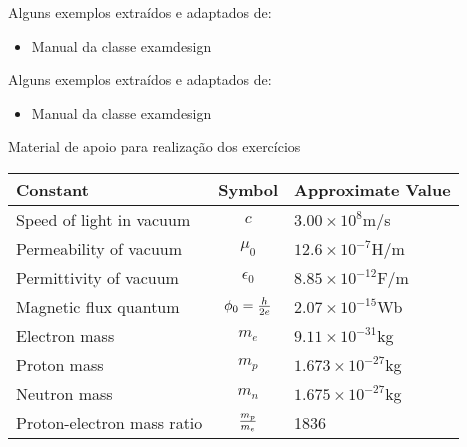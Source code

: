 \documentclass[11pt]{examdesign}
\begin{document}
\begin{examclosing}
\vfill
\begin{notap}
Alguns exemplos extraídos e adaptados de:
\begin{itemize}
	\item Manual da classe examdesign
\end{itemize}
\end{notap}
\end{examclosing}
\begin{keyclosing}
\vfill
\begin{notap}
Alguns exemplos extraídos e adaptados de:
\begin{itemize}
	\item Manual da classe examdesign
\end{itemize}
\end{notap}
\end{keyclosing}


\begin{endmatter}

\centerline
{\Large Material de apoio para realização dos exercícios}
\bigskip
\bigskip

  \begin{center}
  \begin{tabular}{lcl}
    Constant & Symbol & Approximate Value \\ \hline
    Speed of light in vacuum & $c$ & $3.00 \times 10^8$m/s \\
    Permeability of vacuum & $\mu_0$ & $12.6 \times 10^{-7}$H/m \\
    Permittivity of vacuum & $\epsilon_0$ & $8.85 \times 10^{-12}$F/m \\
    Magnetic flux quantum & $\phi_0 = {h \over 2e}$ & $2.07 \times 10^{-15}$Wb \\
    Electron mass & $m_e$ & $9.11 \times 10^{-31}$kg \\
    Proton mass & $m_p$ & $1.673 \times 10^{-27}$kg \\
    Neutron mass & $m_n$ & $1.675 \times 10^{-27}$kg \\
    Proton-electron mass ratio & $m_p \over m_e$ & 1836
  \end{tabular}
  \end{center}
\end{endmatter}


 
\end{document}
